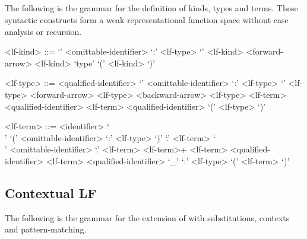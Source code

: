 \subsection{\LF}\label{section:syntax-lf}

The following is the grammar for the definition of \LF kinds, types and terms.
These syntactic constructs form a weak representational function space without case analysis or recursion.

\begin{grammar}
<lf-kind> ::= `{' <omittable-identifier> `:' <lf-type> `}' <lf-kind>
 <forward-arrow> <lf-kind>
\alt `type'
\alt `(' <lf-kind> `)'

<lf-type> ::= <qualified-identifier>
\alt `{' <omittable-identifier> `:' <lf-type> `}' <lf-type>
 <forward-arrow> <lf-type>
 <backward-arrow> <lf-type>
 <lf-term>
 <qualified-identifier> <lf-term>
 <qualified-identifier>
\alt `(' <lf-type> `)'

<lf-term> ::= <identifier>
\alt `\\' `(' <omittable-identifier> `:' <lf-type> `)' `.' <lf-term>
\alt `\\' <omittable-identifier> `.' <lf-term>
 <lf-term>+
 <lf-term>
 <qualified-identifier> <lf-term>
 <qualified-identifier>
\alt `_'
 `:' <lf-type>
\alt `(' <lf-term> `)'
\end{grammar}

\subsection{Contextual LF}\label{section:syntax-contextual-lf}

The following is the grammar for the extension of \LF with substitutions, contexts and pattern-matching.

